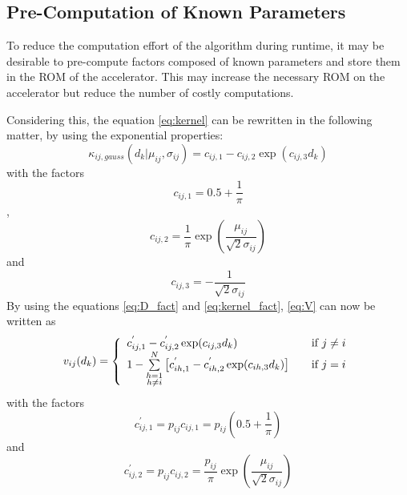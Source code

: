 \documentclass[mscthesis]{usiinfthesis}
\begin{document}
\subsection{Pre-Computation of Known Parameters}
To reduce the computation effort of the algorithm during runtime, it may be
desirable to pre-compute factors composed of known parameters and store them in
the ROM of the accelerator. This may increase the necessary ROM on the
accelerator but reduce the number of costly computations.

Considering this, the equation \ref{eq:kernel} can be rewritten in the
following matter, by using the exponential properties:
\begin{equation}
    \label{eq:kernel_fact}
    \kappa_{ij, gauss}(d_k | \mu_{ij}, \sigma_{ij})
        = c_{ij, 1} - c_{ij, 2} \exp (c_{ij, 3} d_k)
\end{equation}
with the factors
\begin{equation}
    \label{eq:c1}
    c_{ij, 1} = 0.5 + \frac{1}{\pi}
\end{equation}
,
\begin{equation}
    \label{eq:c2}
    c_{ij, 2} = \frac{1}{\pi} \exp(\frac{\mu_{ij}}{\sqrt 2 \sigma_{ij}})
\end{equation}
and
\begin{equation}
    \label{eq:c3}
    c_{ij, 3} = - \frac{1}{\sqrt 2 \sigma_{ij}}
\end{equation}
By using the equations \ref{eq:D_fact} and \ref{eq:kernel_fact}, \ref{eq:V} can
now be written as
\begin{equation}
    \label{eq:V_fact}
    v_{ij}(d_k) = \left\{
        \begin{array}{l l}
            c_{ij, 1}^{'} - c_{ij, 2}^{'} \exp (c_{ij, 3} d_k)
                & \quad \text{if $j \neq i$}\\
            1 - \sum\limits_{\substack{h=1 \\ h \neq i}}^{N} \big [
                c_{ih, 1}^{'} - c_{ih, 2}^{'} \exp (c_{ih, 3} d_k) \big ]
                & \quad \text{if $j = i$}
        \end{array} \right.
\end{equation}
with the factors
\begin{equation}
    \label{eq:c1p}
    c_{ij, 1}^{'} = p_{ij} c_{ij, 1} = p_{ij} (0.5 + \frac{1}{\pi})
\end{equation}
and
\begin{equation}
    \label{eq:c2p}
    c_{ij, 2}^{'} = p_{ij} c_{ij, 2} = \frac{p_{ij}}{\pi}
        \exp(\frac{\mu_{ij}}{\sqrt 2 \sigma_{ij}})
\end{equation}
\end{document}
